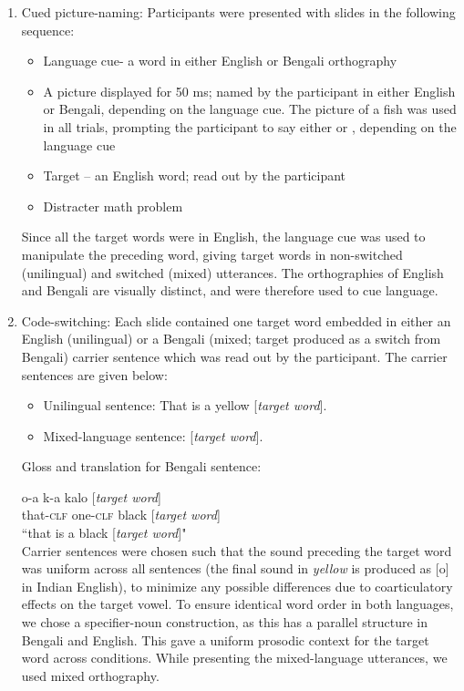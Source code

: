 \documentclass[12 pt]{article}
\newcommand{\nt}[1]{\textipa{[#1]}} %
\begin{document}
\begin{enumerate}[]
	\item Cued picture-naming: Participants were presented with slides in the following sequence:
	\begin{itemize}
		\item Language cue- a word in either English or Bengali orthography
		\item A picture displayed for 50 ms; named by the participant in either English or Bengali, depending on the language cue. The picture of a fish was used in all trials, prompting the participant to say either \nt{fIS} or \nt{ma: \textteshlig \super{h}}, depending on the language cue
		\item Target -- an English word; read out by the participant
		\item Distracter math problem
	\end{itemize}
	Since all the target words were in English, the language cue was used to manipulate the preceding word, giving target words in non-switched (unilingual) and switched (mixed) utterances. The orthographies of English and Bengali are visually distinct, and were therefore used to cue language.
	
	\item Code-switching: Each slide contained one target word embedded in either an English (unilingual) or a Bengali (mixed; target produced as a switch from Bengali) carrier sentence which was read out by the participant. The carrier sentences are given below:
	\begin{itemize}
		\item Unilingual sentence: That is a yellow [\textit{target word}].
		\item Mixed-language sentence:  [\textit{target word}]. 
	\end{itemize}
	
Gloss and translation for Bengali sentence:

o-a \qquad \textipa{\ae}k-a \quad kalo [\textit{target word}]\\
that-\textsc{clf}  one-\textsc{clf}  black [\textit{target word}]\\
``that is a black [\textit{target word}]"\\
	
Carrier sentences were chosen such that the sound preceding the target word was uniform across all sentences (the final sound in \textit{yellow} is produced as [o] in Indian English), to minimize any possible differences due to coarticulatory effects on the target vowel. To ensure identical word order in both languages, we chose a specifier-noun construction, as this has a parallel structure in Bengali and English. This gave a uniform prosodic context for the target word across conditions. While presenting the mixed-language utterances, we used mixed orthography. \\
	
\end{enumerate}
\end{document}
